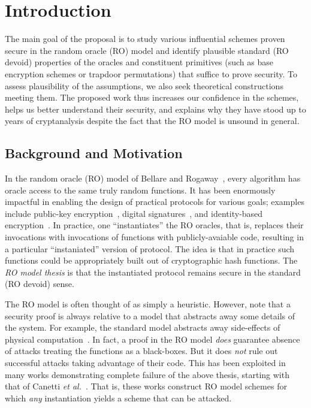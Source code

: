 \section{Introduction}

The main goal of the proposal is to study various influential schemes proven secure in the random oracle (RO) model and identify plausible standard (RO devoid) properties of the oracles and constituent primitives (such as base encryption schemes or trapdoor permutations) that suffice to prove security. To assess plausibility of the assumptions, we also seek theoretical constructions meeting them.  The proposed work thus increases our confidence in the schemes, helps us better understand their security, and explains why they have stood up to years of cryptanalysis despite the fact that the RO model is unsound in general.

\subsection{Background and Motivation}

In the random oracle (RO) model of Bellare and Rogaway~\cite{CCS:BelRog93}, every algorithm has oracle access to the same truly random functions.  It has been enormously impactful in enabling the design of practical protocols for various goals; examples include public-key encryption~\cite{CCS:BelRog93,EC:BelRog94}, digital signatures~\cite{CCS:BelRog93,EC:BelRog96}, and identity-based encryption~\cite{BonFra03}. In practice, one ``instantiates'' the RO oracles, that is, replaces their invocations with invocations of functions with publicly-avaiable code, resulting in a particular ``instaniated'' version of protocol. The idea is that in practice such functions could be appropriately built out of cryptographic hash functions.  The \emph{RO model thesis} is that the instantiated protocol remains secure in the standard (RO devoid) sense.

The RO model is often thought of as simply a heuristic.  However, note that a security proof is always relative to a model that abstracts away some details of the system. For example, the standard model abstracts away side-effects of physical computation~\cite{TCC:MicRey04}.  In fact, a proof in the RO model \emph{does} guarantee absence of   attacks treating the  functions as a black-boxes.  But it does \emph{not} rule out successful attacks taking advantage of their code.  This has been exploited in many works demonstrating complete failure of the above thesis, starting with that of Canetti \emph{et al.}~\cite{JACM:CanGolHal04}.  That is, these works construct RO model schemes for which \emph{any} instantiation yields a scheme that can be attacked. 

